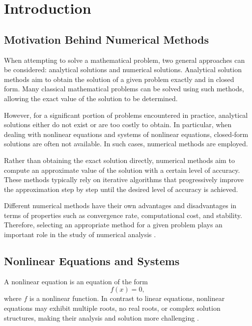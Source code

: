 \chapter{Introduction}

\section{Motivation Behind Numerical Methods}

When attempting to solve a mathematical problem, two general approaches can be considered: analytical solutions and numerical solutions. Analytical solution methods aim to obtain the solution of a given problem exactly and in closed form. Many classical mathematical problems can be solved using such methods, allowing the exact value of the solution to be determined.

However, for a significant portion of problems encountered in practice, analytical solutions either do not exist or are too costly to obtain. In particular, when dealing with nonlinear equations and systems of nonlinear equations, closed-form solutions are often not available. In such cases, numerical methods are employed.

Rather than obtaining the exact solution directly, numerical methods aim to compute an approximate value of the solution with a certain level of accuracy. These methods typically rely on iterative algorithms that progressively improve the approximation step by step until the desired level of accuracy is achieved.

Different numerical methods have their own advantages and disadvantages in terms of properties such as convergence rate, computational cost, and stability. Therefore, selecting an appropriate method for a given problem plays an important role in the study of numerical analysis \cite{burden, atkinson}.

\section{Nonlinear Equations and Systems}

A nonlinear equation is an equation of the form
\begin{equation}
f(x) = 0,
\end{equation}
\noindent where \( f \) is a nonlinear function. In contrast to linear equations, nonlinear equations may exhibit multiple roots, no real roots, or complex solution structures, making their analysis and solution more challenging \cite{burden, atkinson}.

